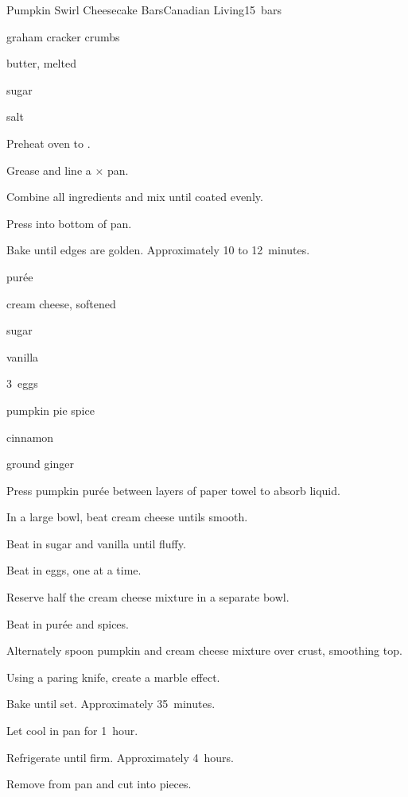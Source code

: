 \begin{recipe}{Pumpkin Swirl Cheesecake Bars}{Canadian Living}{15~bars}

\begin{ingredients}
\item {} graham cracker crumbs
\item \C{\half} butter, melted
\item {} sugar
\item \tp{\half} salt
\end{ingredients}

\begin{directions}
\item Preheat oven to .
\item Grease and line a $\times$ pan.
\item Combine all ingredients and mix until coated evenly.
\item Press into bottom of pan.
\item Bake until edges are golden. Approximately 10 to 12~minutes.
\end{directions}

\begin{ingredients}
\item \C{1\half}  pur\'ee
\item {} cream cheese, softened
\item \C{1\half} sugar
\item {} vanilla
\item 3~eggs
\item \tp{1\half} pumpkin pie spice
\item \tp{\quarter} cinnamon
\item \tp{\quarter} ground ginger
\end{ingredients}

\begin{directions}
\item Press pumpkin pur\'ee between layers of paper towel to absorb liquid.
\item In a large bowl, beat cream cheese untils smooth.
\item Beat in sugar and vanilla until fluffy.
\item Beat in eggs, one at a time.
\item Reserve half the cream cheese mixture in a separate bowl.
\item Beat in pur\'ee and spices.
\item Alternately spoon pumpkin and cream cheese mixture over crust, smoothing top.
\item Using a paring knife, create a marble effect.
\item Bake until set. Approximately 35~minutes.
\item Let cool in pan for 1~hour.
\item Refrigerate until firm. Approximately 4~hours.
\item Remove from pan and cut into pieces.
\end{directions}

\end{recipe}

